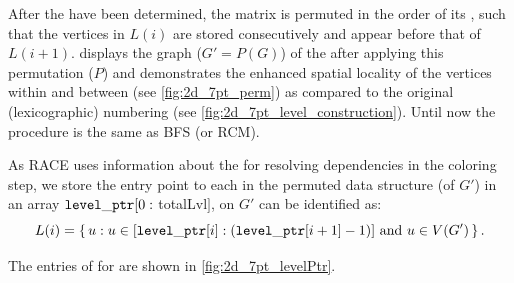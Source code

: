 After the \levels have been determined, the matrix is permuted in the order of its \levels, such that the vertices in $L(i)$ are stored consecutively and appear before that of $L(i+1)$.  displays the graph ($G' = P(G)$) of the \stex after applying this permutation ($P$) and demonstrates the enhanced spatial locality of the vertices within and between \levels (see \cref{fig:2d_7pt_perm}) as compared to the original (lexicographic) numbering (see \cref{fig:2d_7pt_level_construction}).  Until now the procedure is the same as \acrshort{BFS} (or \acrshort{RCM}). 

As \acrshort{RACE} uses information about the \levels for resolving dependencies in the coloring step, we store the entry point to each \level in the permuted data structure (of $G'$) in an array ${\tt level\_ptr}[0:$ \acrshort{totalLvl}$]$, \ie \levels on $G'$ can be identified as:
\begin{equation*}
	L(i) = \set{ u : u \in [{\tt level\_ptr} [i]:({\tt level\_ptr} [i+1]-1)] \text{ and } u \in V(G')} .
\end{equation*}

The entries of \levelPtr for \stex are shown in \cref{fig:2d_7pt_levelPtr}. 
 
